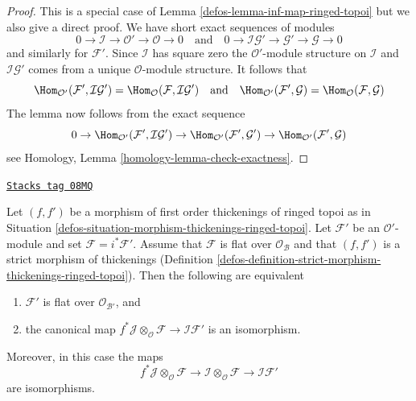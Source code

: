 \begin{proof}

This is a special case of Lemma \ref{defos-lemma-inf-map-ringed-topoi} but we also
give a direct proof. We have short exact sequences of modules
$$
0 \to \mathcal{I} \to \mathcal{O}' \to \mathcal{O} \to 0
\quad\text{and}\quad
0 \to \mathcal{I}\mathcal{G}' \to \mathcal{G}' \to \mathcal{G} \to 0
$$
and similarly for $\mathcal{F}'$.
Since $\mathcal{I}$ has square zero the $\mathcal{O}'$-module
structure on $\mathcal{I}$ and $\mathcal{I}\mathcal{G}'$ comes from
a unique $\mathcal{O}$-module structure. It follows that
$$
\Hom_{\mathcal{O}'}(\mathcal{F}', \mathcal{I}\mathcal{G}') =
\Hom_\mathcal{O}(\mathcal{F}, \mathcal{I}\mathcal{G}')
\quad\text{and}\quad
\Hom_{\mathcal{O}'}(\mathcal{F}', \mathcal{G}) =
\Hom_\mathcal{O}(\mathcal{F}, \mathcal{G})
$$
The lemma now follows from the exact sequence
$$
0 \to \Hom_{\mathcal{O}'}(\mathcal{F}', \mathcal{I}\mathcal{G}') \to
\Hom_{\mathcal{O}'}(\mathcal{F}', \mathcal{G}') \to
\Hom_{\mathcal{O}'}(\mathcal{F}', \mathcal{G})
$$
see Homology, Lemma \ref{homology-lemma-check-exactness}.
\end{proof}

\begin{lemma}
\label{defos-lemma-deform-module-ringed-topoi}
\href{https://stacks.math.columbia.edu/tag/08MQ}{\texttt{Stacks tag 08MQ}}

Let $(f, f')$ be a morphism of first order thickenings of ringed topoi
as in Situation \ref{defos-situation-morphism-thickenings-ringed-topoi}.
Let $\mathcal{F}'$ be an $\mathcal{O}'$-module
and set $\mathcal{F} = i^*\mathcal{F}'$.
Assume that $\mathcal{F}$ is flat over $\mathcal{O}_\mathcal{B}$
and that $(f, f')$ is a strict morphism of thickenings
(Definition \ref{defos-definition-strict-morphism-thickenings-ringed-topoi}).
Then the following are equivalent
\begin{enumerate}
\item $\mathcal{F}'$ is flat over $\mathcal{O}_{\mathcal{B}'}$, and
\item the canonical map
$f^*\mathcal{J} \otimes_\mathcal{O} \mathcal{F} \to
\mathcal{I}\mathcal{F}'$
is an isomorphism.
\end{enumerate}
Moreover, in this case the maps
$$
f^*\mathcal{J} \otimes_\mathcal{O} \mathcal{F} \to
\mathcal{I} \otimes_\mathcal{O} \mathcal{F} \to
\mathcal{I}\mathcal{F}'
$$
are isomorphisms.
\end{lemma}

